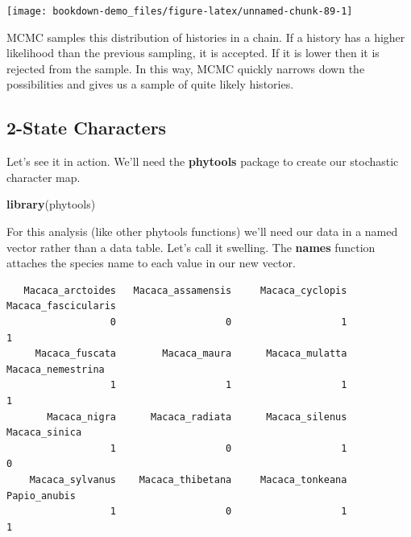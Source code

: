 \documentclass[
]{book}
\newenvironment{Shaded}{\begin{snugshade}}{\end{snugshade}}
\newcommand{\KeywordTok}[1]{\textcolor[rgb]{0.13,0.29,0.53}{\textbf{#1}}}
\newcommand{\NormalTok}[1]{#1}
\newcommand{\OperatorTok}[1]{\textcolor[rgb]{0.81,0.36,0.00}{\textbf{#1}}}
\newcommand{\StringTok}[1]{\textcolor[rgb]{0.31,0.60,0.02}{#1}}
\begin{document}
\begin{center}\texttt{[image: bookdown-demo\_files/figure-latex/unnamed-chunk-89-1]} \end{center}

MCMC samples this distribution of histories in a chain. If a history has a higher likelihood than the previous sampling, it is accepted. If it is lower then it is rejected from the sample. In this way, MCMC quickly narrows down the possibilities and gives us a sample of quite likely histories.

\hypertarget{state-characters}{%
\subsection{2-State Characters}\label{state-characters}}

Let's see it in action. We'll need the \textbf{phytools} package \citep{phytools} to create our stochastic character map.

\begin{Shaded}
\begin{Highlighting}[]
\KeywordTok{library}\NormalTok{(phytools)}
\end{Highlighting}
\end{Shaded}

For this analysis (like other phytools functions) we'll need our data in a named vector rather than a data table. Let's call it swelling. The \textbf{names} function attaches the species name to each value in our new vector.

\begin{Shaded}
\end{Shaded}

\begin{verbatim}
   Macaca_arctoides   Macaca_assamensis     Macaca_cyclopis Macaca_fascicularis 
                  0                   0                   1                   1 
     Macaca_fuscata        Macaca_maura      Macaca_mulatta   Macaca_nemestrina 
                  1                   1                   1                   1 
       Macaca_nigra      Macaca_radiata      Macaca_silenus       Macaca_sinica 
                  1                   0                   1                   0 
    Macaca_sylvanus    Macaca_thibetana     Macaca_tonkeana        Papio_anubis 
                  1                   0                   1                   1 
\end{verbatim}
\end{document}

